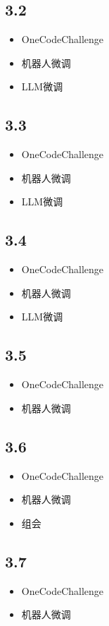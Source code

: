 \documentclass[UTF8]{ctexart}
\begin{document}
\subsection*{3.2}
\begin{itemize}
    \item OneCodeChallenge
    \item 机器人微调
    \item LLM微调
\end{itemize}

\subsection*{3.3}
\begin{itemize}
    \item OneCodeChallenge
    \item 机器人微调
    \item LLM微调
\end{itemize}

\subsection*{3.4}
\begin{itemize}
    \item OneCodeChallenge
    \item 机器人微调
    \item LLM微调
\end{itemize}

\subsection*{3.5}
\begin{itemize}
    \item OneCodeChallenge
    \item 机器人微调
\end{itemize}

\subsection*{3.6}
\begin{itemize}
    \item OneCodeChallenge
    \item 机器人微调
    \item 组会
\end{itemize}

\subsection*{3.7}
\begin{itemize}
    \item OneCodeChallenge
    \item 机器人微调
\end{itemize}
\end{document}
